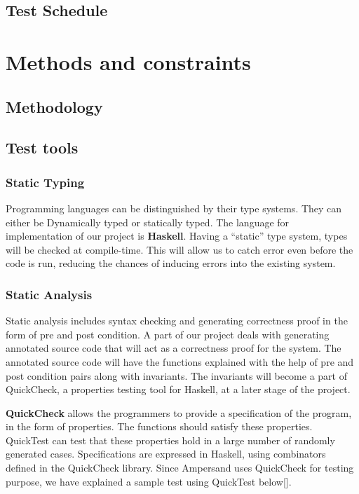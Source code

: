 \documentclass[12pt]{report}
\begin{document}
\section{Test Schedule}


\chapter{Methods and constraints}
\section{Methodology}
\section{Test tools}

\subsection{Static Typing}
Programming languages can be distinguished by their type systems. They can either be Dynamically typed or statically typed. The language for implementation of our project is \textbf{Haskell}. Having a ``static'' type system, types will be checked at compile-time. This will allow us to catch error even before the code is run, reducing the chances of inducing errors into the existing system.

\subsection{Static Analysis}
Static analysis  includes syntax checking and generating correctness proof in the form of pre and post condition. A part of our project deals with generating annotated source code that will act as a correctness proof for the system. The annotated source code will have the functions explained with the help of pre and post condition pairs along with invariants. The invariants will become a part of QuickCheck, a properties testing tool for Haskell, at a later stage of the project.

\textbf{QuickCheck} allows the programmers to provide a specification of the program, in the form of properties. The functions should satisfy these properties. QuickTest can test that these properties hold in a large number of randomly generated cases. Specifications are expressed in Haskell, using combinators defined in the QuickCheck library. Since Ampersand uses QuickCheck for testing purpose, we have explained a sample test using QuickTest below[].
\end{document}
